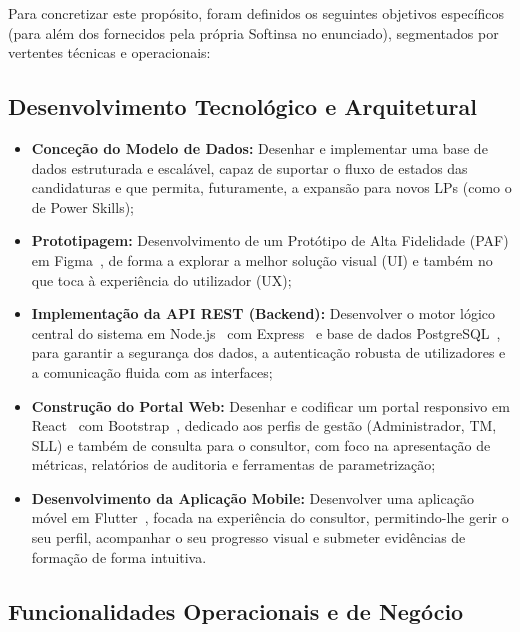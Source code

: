 \documentclass[12pt,a4paper]{report}
\begin{document}
Para concretizar este propósito, foram definidos os seguintes objetivos específicos (para além dos fornecidos pela própria Softinsa no enunciado), segmentados por vertentes técnicas e operacionais:

\subsection{Desenvolvimento Tecnológico e Arquitetural}

\begin{itemize}
  \item \textbf{Conceção do Modelo de Dados:} Desenhar e implementar uma base de dados estruturada e escalável, capaz de suportar o fluxo de estados das candidaturas e que permita, futuramente, a expansão para novos LPs (como o de Power Skills);
  \item \textbf{Prototipagem:} Desenvolvimento de um Protótipo de Alta Fidelidade (PAF) em Figma~\cite{figma}, de forma a explorar a melhor solução visual (UI) e também no que toca à experiência do utilizador (UX);
  \item \textbf{Implementação da API REST (Backend):} Desenvolver o motor lógico central do sistema em Node.js~\cite{nodejs} com Express~\cite{expressjs} e base de dados PostgreSQL\linebreak[0]~\cite{postgresql}, para garantir a segurança dos dados, a autenticação robusta de utilizadores e a comunicação fluida com as interfaces;
  \item \textbf{Construção do Portal Web:} Desenhar e codificar um portal responsivo em React~\cite{react} com Bootstrap~\cite{bootstrap}, dedicado aos perfis de gestão (Administrador, TM, SLL) e também de consulta para o consultor, com foco na apresentação de métricas, relatórios de auditoria e ferramentas de parametrização;
  \item \textbf{Desenvolvimento da Aplicação Mobile:} Desenvolver uma aplicação móvel em Flutter~\cite{flutter}, focada na experiência do consultor, permitindo-lhe gerir o seu perfil, acompanhar o seu progresso visual e submeter evidências de formação de forma intuitiva.
\end{itemize}

\subsection{Funcionalidades Operacionais e de Negócio}
\end{document}
